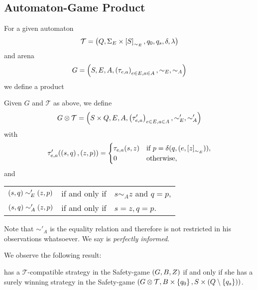 \subsection{Automaton-Game Product}
For a given automaton
\begin{equation*}
  \mathcal{T} = \left(Q, \Sigma_{E}\times \left[S\right]_{\sim_{E}}, q_{0}, 
  q_{s}, \delta, \lambda\right)
\end{equation*}
and arena 
\begin{equation*}
  G = \left(S, E, A, \left(\tau_{e, a}\right)_{e\in E, a\in A}, \sim_{E}, \sim_{A}\right)
\end{equation*}
we define a product
\begin{definition}
  Given $G$ and $\mathcal{T}$ as above, we define
  \begin{equation*}
    G\otimes\mathcal{T} = \left(S\times Q, E, A, 
    \left(\tau'_{e, a}\right)_{e\in E, a\in A}, \sim'_{E}, \sim'_{A}\right)
  \end{equation*}
  with
  \begin{equation*}
    \tau'_{e, a}(\left(s,q\right), \left(z,p\right)) = \begin{cases}
      \tau_{e, a}(s, z)&\text{if }p = \delta(q, (e,\left[z\right]_{\sim_{E}})),\\
      0&\text{otherwise},
    \end{cases}
  \end{equation*}
  and
  \begin{center}
    \begin{tabular}{lll}
      $\left(s, q\right)\sim'_{E}\left(z, p\right)$& if and only if & $s\sim_{A} z$ and 
        $q = p$,\\
      $\left(s, q\right)\sim'_{A}\left(z, p\right)$& if and only if & $s = z, q = p$.
    \end{tabular}
  \end{center}
  Note that $\sim'_{A}$ is the equality relation and therefore \adam{} is not
  restricted in his observations whatsoever. We say \adam{} is 
  \emph{perfectly informed}.
\end{definition}
We observe the following result:
\begin{lemma}
  \eve{} has a $\mathcal{T}$-compatible strategy in the Safety-game
  $\left(G, B, Z\right)$ if and only if she has a surely winning
  strategy in the Safety-game 
  $\left(G\otimes\mathcal{T}, B\times\left\{q_{0}\right\}, 
    S\times\left(Q\setminus\left\{q_{s}\right\}\right)\right)$.
  \label{lem:TembeddedG}
\end{lemma}
